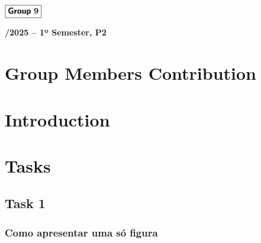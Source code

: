 \documentclass[12pt]{article}
\begin{document}
\begin{flushleft}
    \large $\boxed{\text{\bf \fontfamily{cmss}\selectfont Group} \ \textbf{9}}$\\[4.0cm]
\end{flushleft}
    
\begin{center}
    \large \bf {}/2025 -- 1º Semester, P2
\end{center}

\thispagestyle{empty}

\setcounter{page}{0}

\newpage

\tableofcontents 

\newpage

\section{Group Members Contribution} %


\lipsum[1] \cite{refs1}

\section{Introduction} 


\lipsum[1] \cite{refs2}

\lipsum[2-3]

\newpage

\section{Tasks}

\subsection{Task 1}

\subsubsection{Como apresentar uma só figura}
\end{document}
